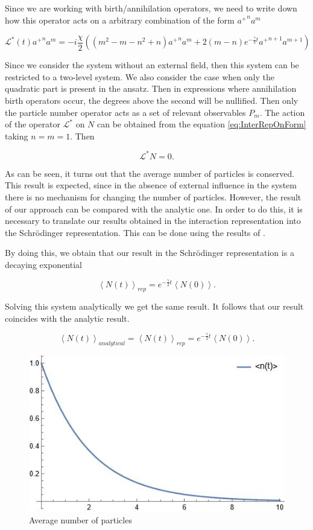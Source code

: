 \documentclass[12pt]{article}
\theoremstyle{definition}
\newcommand\bra{\left<}
\newcommand\ket{\right>}
\newcommand{\braket}[1]{\bra#1\ket}
\def\ga {\gamma}
\begin{document}
	Since we are working with birth/annihilation operators, we need to write down how this operator acts on a arbitrary combination of the form ${a^+}^na^m$
	
	\begin{equation}
		\label{eq:InterRepOnForm}
		\mathcal{L}^*(t){a^+}^na^m = -i\frac{\chi}{2}((m^2 - m - n^2 + n){a^+}^na^m + 2 (m - n) e^{-\frac{\ga}{2}t} {a^+}^{n + 1} a^{m + 1})
	\end{equation}
	
	Since we consider the system without an external field, then this system can be restricted to a two-level system. We also consider the case when only the quadratic part is present in the ansatz. Then in expressions where annihilation birth operators occur, the degrees above the second will be nullified. Then only the particle number operator acts as a set of relevant observables $P_m$. The action of the operator $\mathcal{L}^*$ on $N$ can be obtained from the equation \ref{eq:InterRepOnForm} taking $n = m = 1$. Then
	
	\begin{equation*}
		\mathcal{L}^*N = 0.
	\end{equation*}

	As can be seen, it turns out that the average number of particles is conserved. This result is expected, since in the absence of external influence in the system there is no mechanism for changing the number of particles. However, the result of our approach can be compared with the analytic one. In order to do this, it is necessary to translate our results obtained in the interaction representation into the Schrödinger representation. This can be done using the results of \cite{Dis}.
	
	By doing this, we obtain that our result in the Schrödinger representation is a decaying exponential
	
	 \begin{equation*}
	 	\braket{N(t)}_{rep} = e^{-\frac{\ga}{2}t}\braket{N(0)}.
	 \end{equation*}
	 
	 Solving this system analytically we get the same result. It follows that our result coincides with the analytic result.
	 
	 \begin{equation*}
	 	\braket{N(t)}_{analytical } = \braket{N(t)}_{rep} = e^{-\frac{\ga}{2}t}\braket{N(0)}.
	 \end{equation*}
	 
	 \begin{figure}[h!]
	 	\label{fig:NAv}
	 	\centering
	 	\includegraphics[width=0.6\linewidth]{NAnalitical.JPG}
	 	\caption{Average number of particles}
	 \end{figure}
\end{document}
